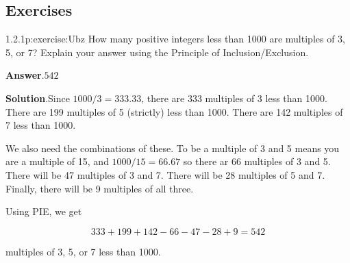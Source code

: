 \documentclass[twoside,11pt,]{book}
\newcommand{\blocktitlefont}{\relax}
\numberwithin{equation}{chapter}
\begin{document}
\subsection*{Exercises}
\begin{divisionsolution}{1.2.1}{}{p:exercise:Ubz}%
How many positive integers less than 1000 are multiples of 3, 5, or 7? Explain your answer using the Principle of Inclusion\slash{}Exclusion.%
\par\smallskip%
\noindent\textbf{\blocktitlefont Answer}.\quad{}\(542\)%
\par\smallskip%
\noindent\textbf{\blocktitlefont Solution}.\quad{}Since \(1000/3 = 333.33\text{,}\) there are 333 multiples of 3 less than 1000. There are 199 multiples of 5 (strictly) less than 1000. There are 142 multiples of 7 less than 1000.%
\par
We also need the combinations of these. To be a multiple of 3 and 5 means you are a multiple of 15, and \(1000/15 = 66.67\) so there ar 66 multiples of 3 and 5. There will be 47 multiples of 3 and 7. There will be 28 multiples of 5 and 7. Finally, there will be 9 multiples of all three.%
\par
Using PIE, we get%
\par
%
\begin{equation*}
333+199 + 142 - 66 - 47 - 28 + 9 = 542
\end{equation*}
%
\par
multiples of 3, 5, or 7 less than 1000.%
\end{divisionsolution}%
\end{document}
